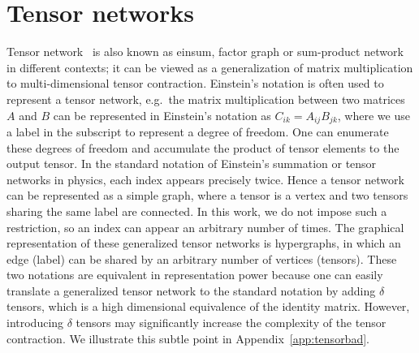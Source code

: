 \documentclass[onefignum, onetabnum]{siamart190516}
\newcommand{\<}{\langle}
\renewcommand{\>}{\rangle}
\newcommand{\App}[1]{Appendix~\ref{#1}}
\begin{document}
\section{Tensor networks}
Tensor network~\cite{Cirac2020, Orus2014} is also known as einsum, factor graph or sum-product network~\cite{Bishop2006} in different contexts;
it can be viewed as a generalization of matrix multiplication to multi-dimensional tensor contraction.
Einstein's notation is often used to represent a tensor network, e.g.\ the matrix multiplication between two matrices $A$ and $B$ can be represented in Einstein's notation as $C_{ik} = A_{ij}B_{jk}$,
where we use a label in the subscript to represent a degree of freedom.
One can enumerate these degrees of freedom and accumulate the product of tensor elements to the output tensor.
In the standard notation of Einstein's summation or tensor networks in physics, each index appears precisely twice.
Hence a tensor network can be represented as a simple graph,
where a tensor is a vertex and two tensors sharing the same label are connected.
In this work, we do not impose such a restriction, so an index can appear an arbitrary number of times. 
The graphical representation of these generalized tensor networks is hypergraphs, in which an edge (label) can be shared by an arbitrary number of vertices (tensors).
These two notations are equivalent in representation power because one can easily translate a generalized tensor network to the standard notation by adding $\delta$ tensors, which is a high dimensional equivalence of the identity matrix.
However, introducing $\delta$ tensors may significantly increase the complexity of the tensor contraction. We illustrate this subtle point in \App{app:tensorbad}.
\end{document}

